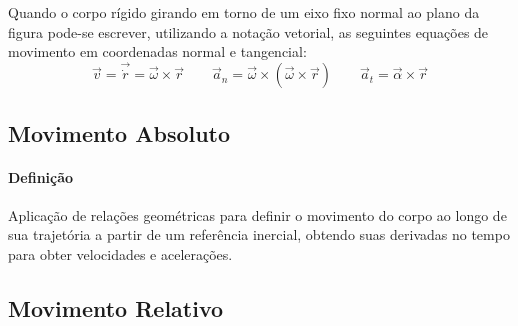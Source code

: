 \documentclass{article}
\begin{document}
            Quando o corpo rígido girando em torno de um eixo fixo normal ao plano da figura pode-se escrever, utilizando a notação vetorial, as seguintes equações de movimento em coordenadas normal e tangencial:
                \begin{equation}
                    \boxed{
                        \vec{v} = \vec{\dot{r}} = \vec{\omega}\times\vec{r}
                    }
                    \qquad
                    \boxed{
                        \vec{a}_{n} = \vec{\omega} \times (\vec{\omega}\times\vec{r})
                    }
                    \qquad
                    \boxed{
                        \vec{a}_{t} = \vec{\alpha} \times \vec{r}
                    }
                \end{equation}

        \subsection{Movimento Absoluto}
            \paragraph{Definição}Aplicação de relações geométricas para definir o movimento do corpo ao longo de sua trajetória a partir de um referência inercial, obtendo suas derivadas no tempo para obter velocidades e acelerações.

        \subsection{Movimento Relativo}
\end{document}
